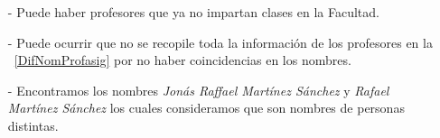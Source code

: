 \begin{itemize}
\item[-] Puede haber profesores que ya no impartan clases en la Facultad.

\item[-] Puede ocurrir que no se recopile toda la información de los profesores en la \tablename{~\ref{DifNomProfasig}} por no haber coincidencias en los nombres.

\item[-] Encontramos los nombres \textit{Jonás Raffael Martínez Sánchez} y \textit{Rafael Martínez Sánchez} los cuales consideramos que son nombres de personas distintas.

\end{itemize}
